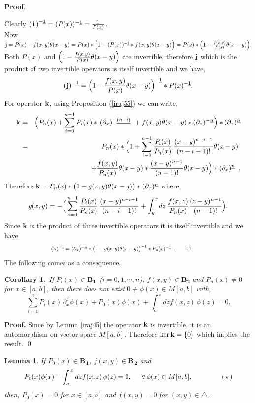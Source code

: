 \documentclass[10pt]{article}
\newcommand{\be}{\begin{equation}}
\newcommand{\ee}{\end{equation}}
\newcommand{\bea}{\begin{eqnarray}}
\newcommand{\eea}{\end{eqnarray}}
\newcommand{\nn}{\nonumber}
\newcommand{\rd}{\partial}
\newtheorem{cor}{Corollary}
\newtheorem{lem}{Lemma}
\begin{document}
{{\bf Proof}. {Clearly  ${(\,\bf{i}\,)}^{-\underline
1}=(P(x))^{-\underline 1}={1\over P(x)}$.\\
Now $ {\bf{j}}=P(x)-f(x,y)\theta(x-y)=P(x)*\Big(1-
(P(x))^{-\underline 1}*f(x,y)\theta(x-y)\Big)=P(x)*\Big(1-
{f(x,y)\over P(x)}\theta(x-y)\Big).$ Both $P(x)$ and $\Big(1-
{f(x,y)\over P(x)}\theta(x-y)\Big)$ are invertible, therefore
${\bf{j}}$ which is the product of two invertible operators is
itself invertible and we have, \be {(\bf{j})}^{-\underline 1}=
\Big(1- {f(x,y)\over P(x)}\theta(x-y)\Big)^{-\underline
1}*P(x)^{-\underline 1}.\nn\ee For operator ${\bf{k}}$, using
Proposition (\ref{iraj55}) we can write,\bea{\bf{k}}&=&\Big(
P_{n}(x)+\sum^{n-1}_{i=0} P_{i}(x)* \,(\rd_{x})^{-\underline
{(n-i)}}\,\,+ f(x,y)\theta(x-y)*(\rd_{x})^{-\underline
n}\Big)*(\rd_{x})^{\underline n}\nn \\ &=& P_{n}(x)*\Big(1
+\sum^{n-1}_{i=0} {P_{i}(x)\over P_{n}(x)} \,{(x-y)^{n-i-1}\over
{(n-i-1)!}}\theta(x-y)\,\,\nn\\&&+ {f(x,y)\over
P_{n}(x)}\theta(x-y)*{(x-y)^{n-1}\over
{(n-1)!}}\theta(x-y)\Big)*(\rd_{x})^{\underline n}\nn \,\,\,. \eea
Therefore ${\bf{k}}=
P_{n}(x)*\big(1-g(x,y)\theta(x-y)\big)*(\rd_{x})^{\underline n}$
where, \be g(x,y)=-\Big(\sum^{n-1}_{i=0} {P_{i}(x)\over P_{n}(x)}
\,{(x-y)^{n-i-1}\over {(n-i-1)!}}+ \int^{x}_{y} dz\,{f(x,z)\over
P_{n}(x)}{(z-y)^{n-1}\over {(n-1)!}}\Big).\nn\ee Since
$\bf{k}$ is the product of three invertible operators it is itself
invertible and we have \be \hspace{3cm}{(\bf{k})}^{-\underline
1}=(\rd_{x})^{-\underline n}*
\big(1-g(x,y)\theta(x-y)\big)^{-\underline 1}*P_{n}(x)^{-\underline
1}\,\,\,.\hspace{4cm \qed} \nn\ee The following comes as a
consequence.
\begin{cor}\label{iraj46}{\,If $P_{i}(x)\in \boldsymbol{B_1}$\, ($i=0,1,\cdots,n$), $f(x,y)\in
\boldsymbol{B_{2}}$ and $P_{n}(x)\neq 0$ for $x\in[a,b]$, then there
does not exist $0 \not\equiv  \phi(x)\in M[a,b]$ with, \be
\sum^{n}_{i=1} P_{i}(x)
\,\rd_{x}^{\,i}\phi(x)+P_{0}(x)\phi(x)+\int^{\,x}_{a} dz
f(x,z)\,\phi(z)=0.\label{chera}\nn\ee}
\end{cor}
{\bf Proof.} Since by Lemma \ref{iraj45} the operator $\bf{k}$ is
invertible, it is an automorphism on vector space $M[a,b]$.
Therefore $\ker{\bf{k}}=\{0\}$ which implies the result. \qed
\begin{lem}\label{jafar}{If $P_{0}(x)\in
\boldsymbol{B_{\,1}}$, $f(x,y)\in \boldsymbol{B_{\,2}}$ and \,\be
P_{0}(x) \phi(x)-\int^{\,x}_{a} dz f(x,z)\,\phi(z)=0, \hspace{0.5cm}
\forall\,\phi(x)\in M[a,b],\hspace{1.5cm}
(\,\star\,)\label{faramarz}\nn\ee then, $P_{0}(x)=0$ for $x\in[a,b]$
and $f(x,y)=0$ for $(x,y)\in \triangle$.}
\end{lem}

}}
\end{document}
